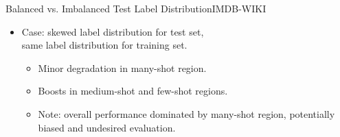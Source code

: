 \begin{frame}{Balanced vs. Imbalanced Test Label Distribution}{IMDB-WIKI}
\begin{itemize}
\begin{itemize}
		\end{itemize}
		\item Case: skewed label distribution for test set, 
		\\same label distribution for training set.
		\begin{itemize}\footnotesize
			\item Minor degradation in many-shot region.
			\item Boosts in medium-shot and few-shot regions.
			\item Note: overall performance dominated by many-shot region, potentially biased and undesired evaluation.
		\end{itemize}
	\end{itemize}
\end{frame}